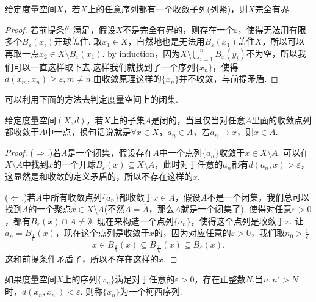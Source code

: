 \begin{proposition}
\rm 给定度量空间$X$，若$X$上的任意序列都有一个收敛子列(列紧)，则$X$完全有界.
\end{proposition}

\begin{proof}
\rm 若前提条件满足，假设$X$不是完全有界的，则存在一个$\varepsilon$，使得无法用有限多个$B_\varepsilon(x_i)$开球盖住. 取$x_1 \in X$，自然地也是无法用$B_\varepsilon(x_1)$盖住$X$，所以可以再取一点$x_2 \in X \setminus B_\varepsilon(x_1)$. by induction，因为$X \setminus \bigcup\limits_{i=1}^{n} B_\varepsilon(y_i)$不为空，所以我们可以一直这样取下去.这样我们就找到了一个序列$\{x_n\}$，使得$d(x_m,x_n) \geq \varepsilon,m \neq n$.由收敛原理这样的$\{x_n\}$并不收敛，与前提矛盾.
\end{proof}

可以利用下面的方法去判定度量空间上的闭集.

\begin{proposition}
给定度量空间$(X,d)$，若$X$上的子集$A$是闭的，当且仅当对任意$A$里面的收敛点列都收敛于$A$中一点，换句话说就是$\forall x \in X，a_n \in A$，若$a_n \rightarrow x$，则$x \in A$.
\end{proposition}

\begin{proof}
($\Rightarrow.$)若$A$是一个闭集，假设存在$A$中一个点列$\{a_n\}$收敛于$x \in X \setminus A$. 可以在$X \setminus A$中找到$x$的一个开球$B_\varepsilon(x) \subseteq X \setminus A$，此时对于任意的$a_n$都有$d(a_n,x) > \varepsilon$，这显然是和收敛的定义矛盾的，所以不存在这样的$x$.

($\Leftarrow.$)若$A$中所有收敛点列$\{a_n\}$都收敛于$x \in A$，假设$A$不是一个闭集，我们总可以找到$A$的一个聚点$x \in X \setminus A$(不然$A = \overline{A}$，那么$A$就是一个闭集了). 使得对任意$\varepsilon > 0$，都有$B_\varepsilon(x) \cap A \neq \emptyset$. 现在来构造一个点列$\{a_n\}$，使得这个点列是收敛于$x$. 让$a_n = B_{\frac{1}{n}}(x)$，现在这个点列是收敛于$x$的，因为对应任意的$\varepsilon > 0$，我们取$n_0 > \frac{1}{\varepsilon}$ \[x \in B_{\frac{1}{n}}(x) \subseteq B_{\frac{1}{n_0}}(x) \subseteq B_\varepsilon(x).\]这和前提条件矛盾了，所以不存在这样的$x$.
\end{proof}


\begin{definition}[度量空间上的柯西序列]
如果度量空间$X$上的序列$\{x_n\}$满足对于任意的$\varepsilon > 0$，存在正整数$N$,当$n,n'>N$时，$d(x_n,x_{n'}) < \varepsilon$. 则称$\{x_n\}$为一个柯西序列.
\end{definition}

